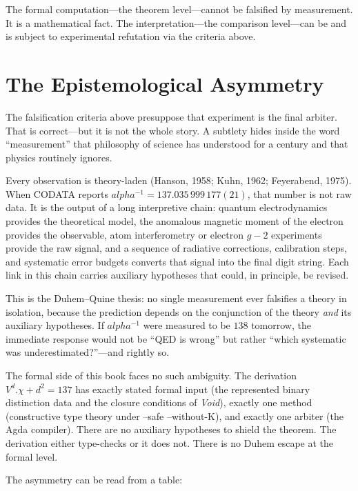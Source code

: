 \documentclass[11pt,a4paper]{book}
\def\alpha{alpha}%
\def\cdot{.}%
\def\texttt#1{#1}%
\begin{document}
The formal computation---the theorem level---cannot be falsified by measurement. It is a mathematical fact. The interpretation---the comparison level---can be and is subject to experimental refutation via the criteria above.

\section*{The Epistemological Asymmetry}

The falsification criteria above presuppose that experiment is the final arbiter. That is correct---but it is not the whole story. A subtlety hides inside the word ``measurement'' that philosophy of science has understood for a century and that physics routinely ignores.

Every observation is theory-laden (Hanson, 1958; Kuhn, 1962; Feyerabend, 1975). When CODATA reports $\alpha^{-1} = 137.035\,999\,177(21)$, that number is not raw data. It is the output of a long interpretive chain: quantum electrodynamics provides the theoretical model, the anomalous magnetic moment of the electron provides the observable, atom interferometry or electron $g{-}2$ experiments provide the raw signal, and a sequence of radiative corrections, calibration steps, and systematic error budgets converts that signal into the final digit string. Each link in this chain carries auxiliary hypotheses that could, in principle, be revised.

This is the Duhem--Quine thesis: no single measurement ever falsifies a theory in isolation, because the prediction depends on the conjunction of the theory \emph{and} its auxiliary hypotheses. If $\alpha^{-1}$ were measured to be $138$ tomorrow, the immediate response would not be ``QED is wrong'' but rather ``which systematic was underestimated?''---and rightly so.

The formal side of this book faces no such ambiguity. The derivation $V^d \cdot \chi + d^2 = 137$ has exactly stated formal input (the represented binary distinction data and the closure conditions of \textit{Void}), exactly one method (constructive type theory under \texttt{--safe --without-K}), and exactly one arbiter (the Agda compiler). There are no auxiliary hypotheses to shield the theorem. The derivation either type-checks or it does not. There is no Duhem escape at the formal level.

The asymmetry can be read from a table:
\end{document}
